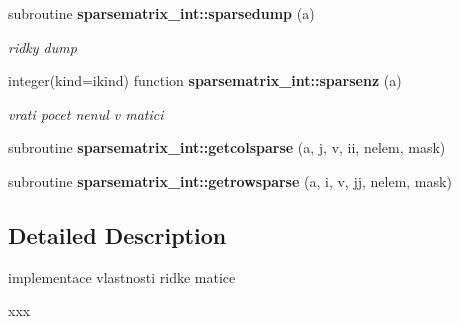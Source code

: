 \begin{DoxyCompactItemize}
subroutine {\bf sparsematrix\+\_\+int\+::sparsedump} (a)
\begin{DoxyCompactList}\small\item\em ridky dump \end{DoxyCompactList}\item 
integer(kind=ikind) function {\bf sparsematrix\+\_\+int\+::sparsenz} (a)
\begin{DoxyCompactList}\small\item\em vrati pocet nenul v matici \end{DoxyCompactList}\item 
subroutine {\bf sparsematrix\+\_\+int\+::getcolsparse} (a, j, v, ii, nelem, mask)
\item 
subroutine {\bf sparsematrix\+\_\+int\+::getrowsparse} (a, i, v, jj, nelem, mask)
\end{DoxyCompactItemize}


\subsection{Detailed Description}
implementace vlastnosti ridke matice 

xxx 